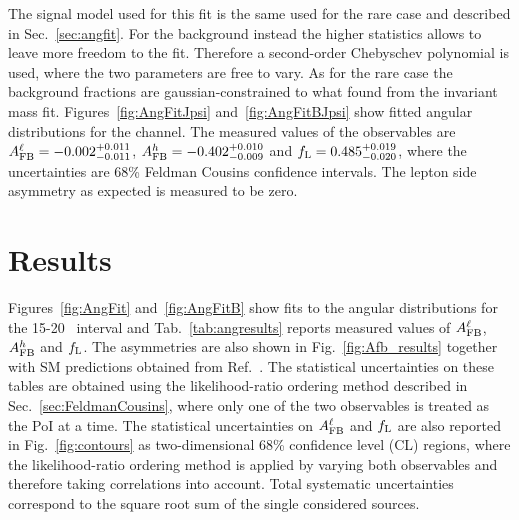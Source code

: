 %
The signal model used for this fit is the same used for the rare case and described in Sec.~\ref{sec:angfit}.
For the background instead the higher statistics allows to leave more freedom to the fit.
Therefore a second-order Chebyschev polynomial is used, where the two parameters are
free to vary. As for the rare case the background fractions are gaussian-constrained
to what found from the invariant mass fit. Figures~\ref{fig:AngFitJpsi} and~\ref{fig:AngFitBJpsi} show
fitted angular distributions for the \jpsi channel. The measured values of the observables
are $A_{\rm FB}^\ell = -0.002^{+0.011}_{-0.011}$, $A_{\rm FB}^h = -0.402^{+0.010}_{-0.009}$
and $f_{\rm L} = 0.485^{+0.019}_{-0.020}$, where the uncertainties are 68\% Feldman Cousins 
confidence intervals. The lepton side asymmetry as expected is measured to be zero.






\section{Results}
\label{sec:afb_results}

Figures~\ref{fig:AngFit} and~\ref{fig:AngFitB} show fits to the angular distributions
for the 15-20 \gevgevcccc ~\qsq interval and 
%
Tab.~\ref{tab:angresults} reports measured values of $A_{\rm FB}^\ell$, $A_{\rm FB}^h$ and $f_{\rm L}$.
The asymmetries are also shown in Fig.~\ref{fig:Afb_results} together with SM predictions obtained from 
Ref.~\cite{Detmold:2012vy}. The statistical uncertainties on these tables 
are obtained using the likelihood-ratio ordering method described in Sec.~\ref{sec:FeldmanCousins}, where only
one of the two observables is treated as the PoI at a time. The statistical uncertainties
on $A_{\rm FB}^\ell$ and $f_{\rm L}$ are also reported in Fig.~\ref{fig:contours} as two-dimensional 68\;\% confidence level (CL) regions,
where the likelihood-ratio ordering method is applied by varying both observables and therefore taking
correlations into account. Total systematic uncertainties correspond to the square root sum of the
single considered sources.

